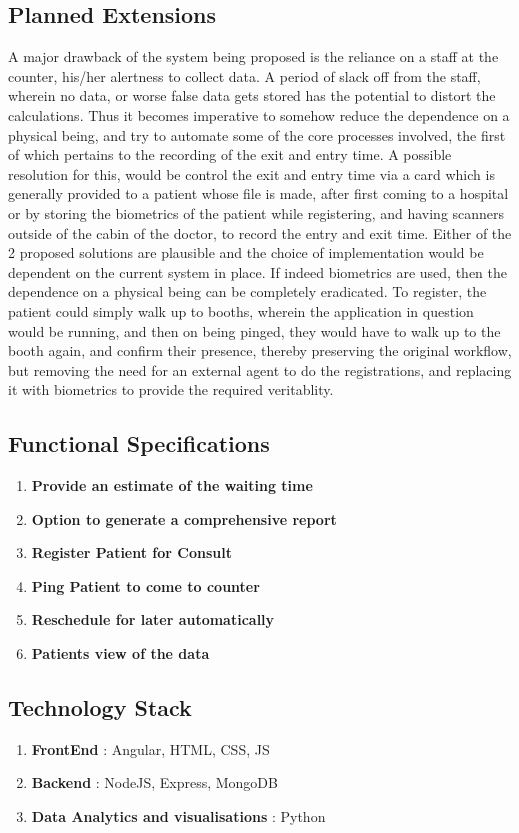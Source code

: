 \documentclass{article}
\begin{document}
\subsection*{Planned Extensions}
A major drawback of the system being proposed is the reliance on a staff at the counter, his/her alertness to collect data. A period of slack off from the staff, wherein no data, or worse false data gets stored has the potential to distort the calculations. Thus it becomes imperative to somehow reduce the dependence on a physical being, and try to automate some of the core processes involved, the first of which pertains to the recording of the exit and entry time. A possible resolution for this, would be control the exit and entry time via a card which is generally provided to a patient whose file is made, after first coming to a hospital or by storing the biometrics of the patient while registering, and having scanners outside of the cabin of the doctor, to record the entry and exit time. Either of the 2 proposed solutions are plausible and the choice of implementation would be dependent on the current system in place. If indeed biometrics are used, then the dependence on a physical being can be completely eradicated. To register, the patient could simply walk up to booths, wherein the application in question would be running, and then on being pinged, they would have to walk up to the booth again, and confirm their presence, thereby preserving the original workflow, but removing the need for an external agent to do the registrations, and replacing it with biometrics to provide the required veritablity. 


\subsection*{Functional Specifications}
\begin{enumerate}
	\item \textbf{Provide an estimate of the waiting time}
	\item \textbf{Option to generate a comprehensive report}
	\item \textbf{Register Patient for Consult}
	\item \textbf{Ping Patient to come to counter}
	\item \textbf{Reschedule for later automatically}
	\item \textbf{Patients view of the data}
\end{enumerate}

\subsection*{Technology Stack}
\begin{enumerate}
	\item \textbf{FrontEnd } : Angular, HTML, CSS, JS
	\item \textbf{Backend} : NodeJS, Express, MongoDB
	\item \textbf{Data Analytics and visualisations} : Python \\
\end{enumerate}

\newpage
\end{document}
